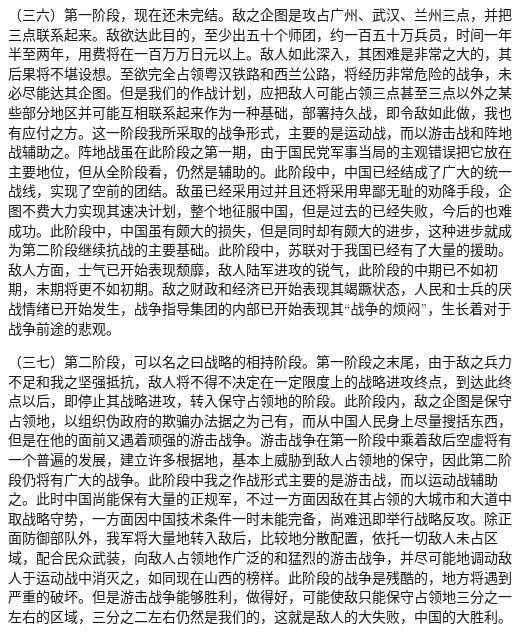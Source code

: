 \documentclass[UTF8, 12pt, a4paper]{ctexrep}
\begin{document}
（三六）第一阶段，现在还未完结。敌之企图是攻占广州、武汉、兰州三点，并把三点联系起来。敌欲达此目的，至少出五十个师团，约一百五十万兵员，时间一年半至两年，用费将在一百万万日元以上。敌人如此深入，其困难是非常之大的，其后果将不堪设想。至欲完全占领粤汉铁路和西兰公路，将经历非常危险的战争，未必尽能达其企图。但是我们的作战计划，应把敌人可能占领三点甚至三点以外之某些部分地区并可能互相联系起来作为一种基础，部署持久战，即令敌如此做，我也有应付之方。这一阶段我所采取的战争形式，主要的是运动战，而以游击战和阵地战辅助之。阵地战虽在此阶段之第一期，由于国民党军事当局的主观错误把它放在主要地位，但从全阶段看，仍然是辅助的。此阶段中，中国已经结成了广大的统一战线，实现了空前的团结。敌虽已经采用过并且还将采用卑鄙无耻的劝降手段，企图不费大力实现其速决计划，整个地征服中国，但是过去的已经失败，今后的也难成功。此阶段中，中国虽有颇大的损失，但是同时却有颇大的进步，这种进步就成为第二阶段继续抗战的主要基础。此阶段中，苏联对于我国已经有了大量的援助。敌人方面，士气已开始表现颓靡，敌人陆军进攻的锐气，此阶段的中期已不如初期，末期将更不如初期。敌之财政和经济已开始表现其竭蹶状态，人民和士兵的厌战情绪已开始发生，战争指导集团的内部已开始表现其“战争的烦闷”，生长着对于战争前途的悲观。

（三七）第二阶段，可以名之曰战略的相持阶段。第一阶段之末尾，由于敌之兵力不足和我之坚强抵抗，敌人将不得不决定在一定限度上的战略进攻终点，到达此终点以后，即停止其战略进攻，转入保守占领地的阶段。此阶段内，敌之企图是保守占领地，以组织伪政府的欺骗办法据之为己有，而从中国人民身上尽量搜括东西，但是在他的面前又遇着顽强的游击战争。游击战争在第一阶段中乘着敌后空虚将有一个普遍的发展，建立许多根据地，基本上威胁到敌人占领地的保守，因此第二阶段仍将有广大的战争。此阶段中我之作战形式主要的是游击战，而以运动战辅助之。此时中国尚能保有大量的正规军，不过一方面因敌在其占领的大城市和大道中取战略守势，一方面因中国技术条件一时未能完备，尚难迅即举行战略反攻。除正面防御部队外，我军将大量地转入敌后，比较地分散配置，依托一切敌人未占区域，配合民众武装，向敌人占领地作广泛的和猛烈的游击战争，并尽可能地调动敌人于运动战中消灭之，如同现在山西的榜样。此阶段的战争是残酷的，地方将遇到严重的破坏。但是游击战争能够胜利，做得好，可能使敌只能保守占领地三分之一左右的区域，三分之二左右仍然是我们的，这就是敌人的大失败，中国的大胜利。
\end{document}
